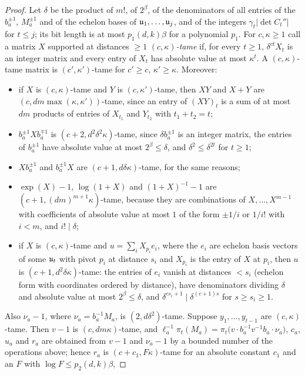 \begin{proof}
Let $\delta$ be the product of $m!$, of $2^{\beta}$, of the denominators of all entries of the
$b_a^{\pm1}$, $M_a^{\pm1}$ and of the echelon bases of $\mathfrak{u}_1,\ldots,\mathfrak{u}_j$, and of the integers
$\gamma_t|\det C_t''|$ for $t\le j$; its bit length is at most $p_1(d,k)\beta$ for a polynomial $p_1$.
For $c,\kappa\ge1$ call a matrix $X$ supported at distances $\ge1$ \emph{$(c,\kappa)$-tame} if, for
every $t\ge1$, $\delta^{ct}X_t$ is an integer matrix and every entry of $X_t$ has absolute value at
most $\kappa^t$. A $(c,\kappa)$-tame matrix is $(c',\kappa')$-tame for $c'\ge c$, $\kappa'\ge\kappa$.
Moreover:
\begin{itemize}
\item if $X$ is $(c,\kappa)$-tame and $Y$ is $(c,\kappa')$-tame, then $XY$ and $X+Y$ are
$(c,dm\max(\kappa,\kappa'))$-tame, since an entry of $(XY)_t$ is a sum of at most $dm$ products of
entries of $X_{t_1}$ and $Y_{t_2}$ with $t_1+t_2=t$;
\item $b_a^{\pm1}Xb_a^{\mp1}$ is $(c+2,d^2\delta^2\kappa)$-tame, since $\delta b_a^{\pm1}$ is an integer
matrix, the entries of $b_a^{\pm1}$ have absolute value at most $2^\beta\le\delta$, and
$\delta^2\le\delta^{2t}$ for $t\ge1$;
\item $Xb_a^{\pm1}$ and $b_a^{\pm1}X$ are $(c+1,d\delta\kappa)$-tame, for the same reasons;
\item $\exp(X)-1$, $\log(1+X)$ and $(1+X)^{-1}-1$ are $(c+1,(dm)^{m+1}\kappa)$-tame, because they
are combinations of $X,\ldots,X^{m-1}$ with coefficients of absolute value at most $1$ of the form
$\pm1/i$ or $1/i!$ with $i<m$, and $i!\mid\delta$;
\item if $X$ is $(c,\kappa)$-tame and $u=\sum_iX_{p_i}e_i$, where the $e_i$ are echelon basis vectors
of some $\mathfrak{u}_t$ with pivot $p_i$ at distance $s_i$ and $X_{p_i}$ is the entry of $X$ at $p_i$, then $u$
is $(c+1,d^2\delta\kappa)$-tame: the entries of $e_i$ vanish at distances $<s_i$ (echelon form with
coordinates ordered by distance), have denominators dividing $\delta$ and absolute value at most
$2^\beta\le\delta$, and $\delta^{cs_i+1}\mid\delta^{(c+1)s}$ for $s\ge s_i\ge1$.
\end{itemize}
Also $\nu_a-1$, where $\nu_a=b_a^{-1}M_a$, is $(2,d\delta^2)$-tame. Suppose $y_1,\ldots,y_{t-1}$ are
$(c,\kappa)$-tame. Then $v-1$ is $(c,dm\kappa)$-tame, and
$\ell_a^{-1}\pi_t(M_a)=\pi_t\bigl(v\cdot b_a^{-1}v^{-1}b_a\cdot\nu_a\bigr)$, $c_a$, $u_a$ and $r_a$ are
obtained from $v-1$ and $\nu_a-1$ by a bounded number of the operations above; hence $r_a$ is
$(c+c_1,F\kappa)$-tame for an absolute constant $c_1$ and an $F$ with $\log F\le p_2(d,k)\beta$,

\end{proof}

